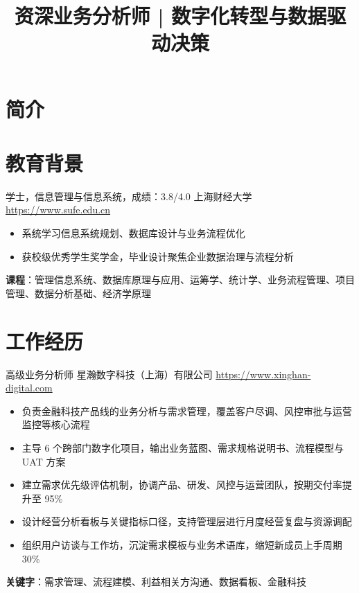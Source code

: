 \documentclass[a4paper, serif, 10pt]{moderncv}
\title{资深业务分析师 | 数字化转型与数据驱动决策}
\begin{document}
\maketitle

\section{简介}

\section{教育背景}

        {学士，信息管理与信息系统，成绩：3.8/4.0}
        {上海财经大学}
        {\url{https://www.sufe.edu.cn}}
        {}
        {\begin{itemize}
\item 系统学习信息系统规划、数据库设计与业务流程优化
\item 获校级优秀学生奖学金，毕业设计聚焦企业数据治理与流程分析
\end{itemize}
\textbf{课程}：管理信息系统、数据库原理与应用、运筹学、统计学、业务流程管理、项目管理、数据分析基础、经济学原理}
\section{工作经历}

        {高级业务分析师}
        {星瀚数字科技（上海）有限公司}
        {\url{https://www.xinghan-digital.com}}
        {}
        {\begin{itemize}
\item 负责金融科技产品线的业务分析与需求管理，覆盖客户尽调、风控审批与运营监控等核心流程
\item 主导 6 个跨部门数字化项目，输出业务蓝图、需求规格说明书、流程模型与 UAT 方案
\item 建立需求优先级评估机制，协调产品、研发、风控与运营团队，按期交付率提升至 95\%
\item 设计经营分析看板与关键指标口径，支持管理层进行月度经营复盘与资源调配
\item 组织用户访谈与工作坊，沉淀需求模板与业务术语库，缩短新成员上手周期 30\%
\end{itemize}
\textbf{关键字}：需求管理、流程建模、利益相关方沟通、数据看板、金融科技}
\end{document}
